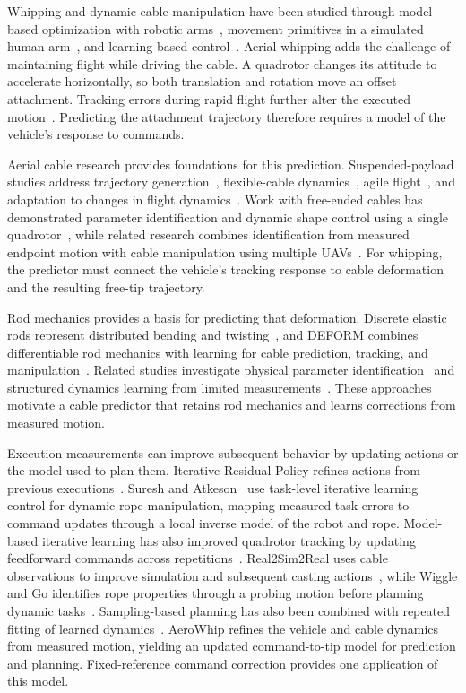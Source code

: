 \documentclass[letterpaper, 10 pt, conference]{ieeeconf}
\begin{document}
Whipping and dynamic cable manipulation have been studied through
model-based optimization with robotic
arms~\cite{zimmermann2021dynamic}, movement primitives in a
simulated human arm~\cite{nah2023learning}, and learning-based
control~\cite{wang2024learning}. Aerial whipping adds the challenge
of maintaining flight while driving the cable. A quadrotor changes
its attitude to accelerate horizontally, so both translation and
rotation move an offset attachment. Tracking errors during rapid
flight further alter the executed motion~\cite{torrente2021data}.
Predicting the attachment trajectory therefore requires a model
of the vehicle's response to commands.

Aerial cable research provides foundations for this prediction.
Suspended-payload studies address trajectory
generation~\cite{sreenath2013trajectory}, flexible-cable
dynamics~\cite{8308004}, agile flight~\cite{cao2026flare}, and
adaptation to changes in flight dynamics~\cite{belkhale2021model}.
Work with free-ended cables has demonstrated parameter
identification and dynamic shape control using a single
quadrotor~\cite{shen2025aerial}, while related research combines
identification from measured endpoint motion with cable manipulation
using multiple UAVs~\cite{gabellieri2025manipulation}.
For whipping, the predictor must connect the vehicle's tracking
response to cable deformation and the resulting free-tip trajectory.

Rod mechanics provides a basis for predicting that deformation.
Discrete elastic rods represent distributed bending and
twisting~\cite{bergou2008discrete}, and DEFORM combines
differentiable rod mechanics with learning for cable prediction,
tracking, and manipulation~\cite{pmlr-v270-chen25d}.
Related studies investigate physical parameter
identification~\cite{chen2025accurate} and structured dynamics
learning from limited measurements~\cite{mamedov2025learning}.
These approaches motivate a cable predictor that retains rod
mechanics and learns corrections from measured motion.

Execution measurements can improve subsequent behavior by
updating actions or the model used to plan them. Iterative
Residual Policy refines actions from previous
executions~\cite{chi2024iterative}. Suresh and
Atkeson~\cite{suresh2026learning} use task-level iterative learning
control for dynamic rope manipulation, mapping measured task errors
to command updates through a local inverse model of the robot and rope.
Model-based iterative learning has also improved quadrotor
tracking by updating feedforward commands across
repetitions~\cite{schoellig2012optimization}.
Real2Sim2Real uses cable observations to improve simulation and
subsequent casting actions~\cite{lim2022real2sim2real}, while
Wiggle and Go identifies rope properties through a probing motion
before planning dynamic tasks~\cite{jakobsson2026wiggle}.
Sampling-based planning has also been combined with repeated
fitting of learned dynamics~\cite{williams2017information}.
AeroWhip refines the vehicle and cable dynamics from measured
motion, yielding an updated command-to-tip model for prediction
and planning. Fixed-reference command correction provides one
application of this model.
\end{document}
